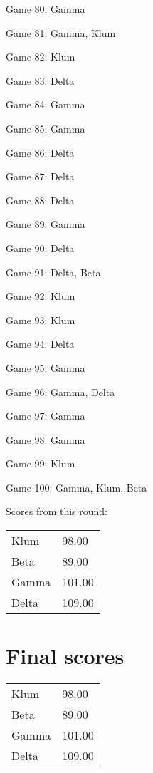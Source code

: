 \documentclass{article}
\begin{document}
\begin{multicols}{3}
\begin{compactitem}
\item Game 80:
Gamma
\item Game 81:
Gamma, Klum
\item Game 82:
Klum
\item Game 83:
Delta
\item Game 84:
Gamma
\item Game 85:
Gamma
\item Game 86:
Delta
\item Game 87:
Delta
\item Game 88:
Delta
\item Game 89:
Gamma
\item Game 90:
Delta
\item Game 91:
Delta, Beta
\item Game 92:
Klum
\item Game 93:
Klum
\item Game 94:
Delta
\item Game 95:
Gamma
\item Game 96:
Gamma, Delta
\item Game 97:
Gamma
\item Game 98:
Gamma
\item Game 99:
Klum
\item Game 100:
Gamma, Klum, Beta
\end{compactitem}
\end{multicols}
Scores from this round:
\begin{tabular}[t]{ll}
Klum & 98.00\\
Beta & 89.00\\
Gamma & 101.00\\
Delta & 109.00\\
\end{tabular}
\section*{Final scores}

\begin{center}
\begin{tabular}[t]{ll}
Klum & 98.00\\
Beta & 89.00\\
Gamma & 101.00\\
Delta & 109.00\\
\end{tabular}
\end{center}
\end{document}
